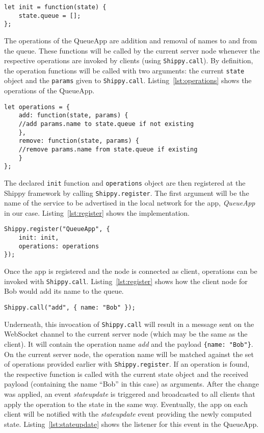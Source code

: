 \begin{lstlisting}[caption={QueueApp init function},label={lst:init}]
let init = function(state) {
    state.queue = [];
};
\end{lstlisting}

The operations of the QueueApp are addition and removal of names to and from the queue.
These functions will be called by the current server node whenever the respective operations are invoked by clients (using \texttt{Shippy.call}).
By definition, the operation functions will be called with two arguments: the current \texttt{state} object and the \texttt{params} given to \texttt{Shippy.call}.
Listing~\ref{lst:operations} shows the operations of the QueueApp.

\begin{lstlisting}[caption={QueueApp operations},label={lst:operations}]
let operations = {
    add: function(state, params) {
    //add params.name to state.queue if not existing
    },
    remove: function(state, params) {
    //remove params.name from state.queue if existing
    }
};
\end{lstlisting}

The declared \texttt{init} function and \texttt{operations} object are then registered at the Shippy framework by calling \texttt{Shippy.register}.
The first argument will be the name of the service to be advertised in the local network for the app, \textit{QueueApp} in our case.
Listing~\ref{lst:register} shows the implementation.

\begin{lstlisting}[caption={Shippy.register},label={lst:register}]
Shippy.register("QueueApp", {
    init: init,
    operations: operations
});
\end{lstlisting}

Once the app is registered and the node is connected as client, operations can be invoked with \texttt{Shippy.call}. Listing~\ref{lst:register} shows how the client node for Bob would add its name to the queue.
\begin{lstlisting}[caption={Shippy.call},label={lst:call}]
Shippy.call("add", { name: "Bob" });
\end{lstlisting}

Underneath, this invocation of \texttt{Shippy.call} will result in a message sent on the WebSocket channel to the current server node (which may be the same as the client).
It will contain the operation name \textit{add} and the payload \texttt{\{name: "Bob"\}}.
On the current server node, the operation name will be matched against the set of operations provided earlier with \texttt{Shippy.register}.
If an operation is found, the respective function is called with the current state object and the received payload (containing the name ``Bob'' in this case) as arguments.
After the change was applied, an event \textit{stateupdate} is triggered and broadcasted to all clients that apply the operation to the state in the same way.
Eventually, the app on each client will be notified with the \textit{stateupdate} event providing the newly computed state.
Listing~\ref{lst:stateupdate} shows the listener for this event in the QueueApp.

